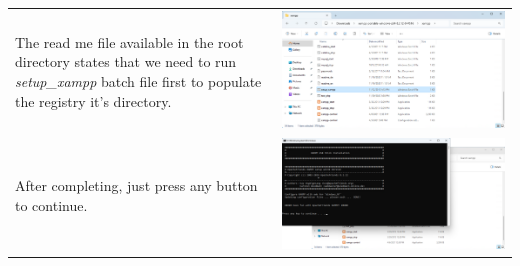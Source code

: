 \documentclass[11pt,a4paper]{report}
\begin{document}
        \begin{tabular}{ l r }
            The read me file available in the root directory states that
            we need to run \textit{setup_xampp} batch file first to populate the
            registry it's directory.                                        & \includegraphics[scale=0.3]{install_xampp08} \\ %

            After completing, just press any button to continue.            & \includegraphics[scale=0.3]{install_xampp09} \\


\end{tabular}
\end{document}
